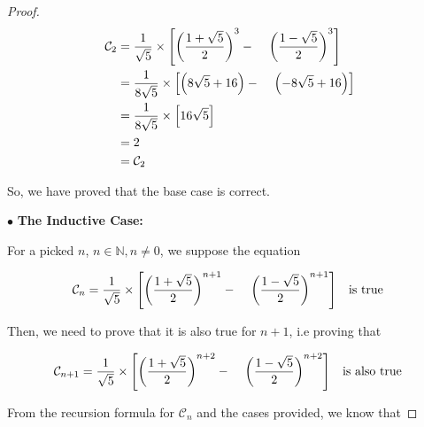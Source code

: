 \documentclass[12pt]{article}
\begin{document}
\begin{proof}
    \begin{align*}
        \mathcal{C}_{2} & = \frac{1}{\sqrt{5}} \times \left[ \left( \frac{1+\sqrt{5}}{2} 
    \right)^{3} -  \hspace*{0.4cm}\left( \frac{1-\sqrt{5}}{2} \right)^{3} \right] \\
        & = \frac{1}{8\sqrt{5}} \times \left[ \left( 8\sqrt{5}+16
        \right) -  \hspace*{0.4cm}\left( -8\sqrt{5}+16 \right) \right]\\
        & = \frac{1}{8\sqrt{5}} \times \left[ 16\sqrt{5} \right]\\
        & = 2 \\
        & = \mathcal{C}_2
    \end{align*}

    \vspace*{0.3cm}
    \hspace*{1.2cm}
    So, we have proved that the base case is correct.


    \vspace*{0.3cm}
    \hspace*{1.2cm}
    $\bullet$ \textbf{The Inductive Case:}

    \vspace*{0.3cm}
    \hspace*{1.2cm}
    For a picked $n$, $n \in \mathbb{N} , n \neq 0 $, we suppose the equation

    \[ \mathcal{C}_{n} = \frac{1}{\sqrt{5}} \times \left[ \left( \frac{1+\sqrt{5}}{2} 
    \right)^{n+1} -  \hspace*{0.4cm}\left( \frac{1-\sqrt{5}}{2} \right)^{n+1} \right] 
    \hspace*{0.3cm} \text{is true }\]

    \vspace*{0.3cm}
    \hspace*{1.2cm}
    Then, we need to prove that it is also true for $n+1$, i.e proving that

    \[ \mathcal{C}_{n+1} = \frac{1}{\sqrt{5}} \times \left[ \left( \frac{1+\sqrt{5}}{2} 
    \right)^{n+2} -  \hspace*{0.4cm}\left( \frac{1-\sqrt{5}}{2} \right)^{n+2} \right] 
    \hspace*{0.3cm} \text{is also true }\]

    \vspace*{0.3cm}
    \hspace*{1.2cm}
    From the recursion formula for $\mathcal{C}_n$ and the cases provided, we know that


\end{proof}
\end{document}
